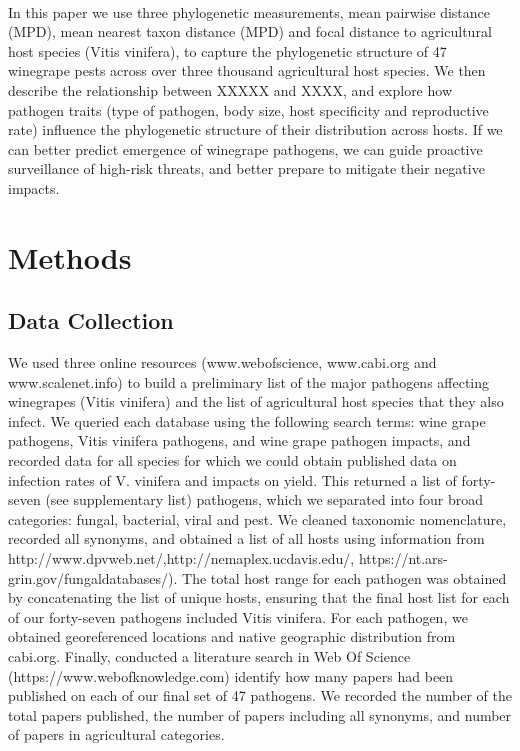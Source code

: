 \documentclass[11pt,letter]{article}
\begin{document}
\paragraph{}In this paper we use three phylogenetic measurements, mean pairwise distance (MPD), mean nearest taxon distance (MPD) and focal distance to agricultural host species (Vitis vinifera), to capture the phylogenetic structure of 47 winegrape pests across over three thousand agricultural host species. We then describe the relationship between XXXXX and XXXX, and explore how pathogen traits (type of pathogen, body size, host specificity and reproductive rate) influence the phylogenetic structure of their distribution across hosts. If we can better predict emergence of winegrape pathogens, we can guide proactive surveillance of high-risk threats, and better prepare to mitigate their negative impacts.


\section{Methods}
\subsection{Data Collection}
We used three online resources (www.webofscience, www.cabi.org and www.scalenet.info) to build a preliminary list of the major pathogens affecting winegrapes (Vitis vinifera) and the list of agricultural host species that they also infect. We queried each database using the following search terms: wine grape pathogens, Vitis vinifera pathogens, and wine grape pathogen impacts, and recorded data for all species for which we could obtain published data on infection rates of V. vinifera and impacts on yield. This returned a list of forty-seven (see supplementary list) pathogens, which we separated into four broad categories: fungal, bacterial, viral and pest. We cleaned taxonomic nomenclature, recorded all synonyms, and obtained a list of all hosts using information from http://www.dpvweb.net/,http://nemaplex.ucdavis.edu/, https://nt.ars-grin.gov/fungaldatabases/). The total host range for each pathogen was obtained by concatenating the list of unique hosts, ensuring that the final host list for each of our forty-seven pathogens included Vitis vinifera. 
For each pathogen, we obtained georeferenced locations and native geographic distribution from cabi.org. Finally, conducted a literature search in Web Of Science (https://www.webofknowledge.com) identify how many papers had been published on each of our final set of 47 pathogens. We recorded the number of the total papers published, the number of papers including all synonyms, and number of papers in agricultural categories.  
\end{document}
